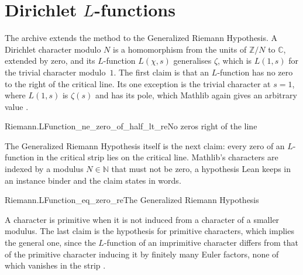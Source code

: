 \documentclass{article}
\begin{document}
\section{Dirichlet $L$-functions}

The archive extends the method to the Generalized Riemann Hypothesis. A
Dirichlet character modulo $N$ is a homomorphism from the units of
$\mathbb{Z}/N$ to $\mathbb{C}$, extended by zero, and its $L$-function
$L(\chi, s)$ generalises $\zeta$, which is $L(1, s)$ for the trivial
character modulo~$1$. The first claim is that an $L$-function has no zero to
the right of the critical line. Its one exception is the trivial character at
$s = 1$, where $L(1, s)$ is $\zeta(s)$ and has its pole, which Mathlib again
gives an arbitrary value .

\begin{leanclaim}[claim, sum=NSd92KdVig]{Riemann.LFunction_ne_zero_of_half_lt_re}{No zeros right of the line}
\label{claim:Riemann.LFunction_ne_zero_of_half_lt_re}
\end{leanclaim}

The Generalized Riemann Hypothesis itself is the next claim: every zero of an
$L$-function in the critical strip lies on the critical line. Mathlib's
characters are indexed by a modulus $N \in \mathbb{N}$ that must not be zero,
a hypothesis Lean keeps in an instance binder and the claim states in words.

\begin{leanclaim}[claim, sum=qs-bCOgVj8]{Riemann.LFunction_eq_zero_re}{The Generalized Riemann Hypothesis}
\label{claim:Riemann.LFunction_eq_zero_re}
\end{leanclaim}

A character is primitive when it is not induced from a character of a smaller
modulus. The last claim is the hypothesis for primitive characters, which
implies the general one, since the $L$-function of an imprimitive character
differs from that of the primitive character inducing it by finitely many
Euler factors, none of which vanishes in the strip
.
\end{document}
